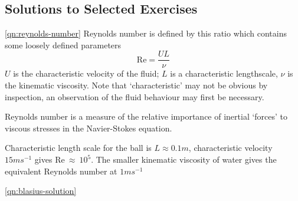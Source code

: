 \documentclass[10pt]{report}
\begin{document}
\begin{answer6}
\newpage
\section{Solutions to Selected Exercises}


\begin{questionnumber}{\ref{qn:reynolds-number}}
	Reynolds number is defined by this ratio which contains some loosely defined
	parameters
	\[
		\text{Re} = \frac{UL}{\nu}
	\]
	$U$ is the characteristic velocity of the fluid; $L$ is a characteristic
	lengthscale, $\nu$ is the kinematic viscosity. Note that `characteristic' may
	not be obvious by inspection, an observation of the fluid behaviour may
	first be necessary.

	Reynolds number is a measure of the relative importance of inertial `forces' to
	viscous stresses in the Navier-Stokes equation.

	Characteristic length scale for the ball is $L \approx 0.1m$, characteristic velocity $15ms^{-1}$
	gives $\text{Re}~\approx~10^{5}$. The smaller kinematic viscosity of water gives
	the equivalent Reynolds number at $1ms^{{-1}}$
\end{questionnumber}

\begin{questionnumber}{\ref{qn:blasius-solution}}

\newcommand{\pd}[2]{\frac{\partial {#1} }{\partial {#2}}}
\newcommand{\ppd}[2]{\frac{\partial^{2} {#1} }{\partial {#2}^{2}}}
\newcommand{\pppd}[2]{\frac{\partial^{3} {#1} }{\partial {#2}^{3}}}
\newcommand{\ppdd}[3]{\frac{\partial^{2} {#1} }{\partial {#2} \partial {#3}}}


\end{questionnumber}
\end{answer6}
\end{document}
